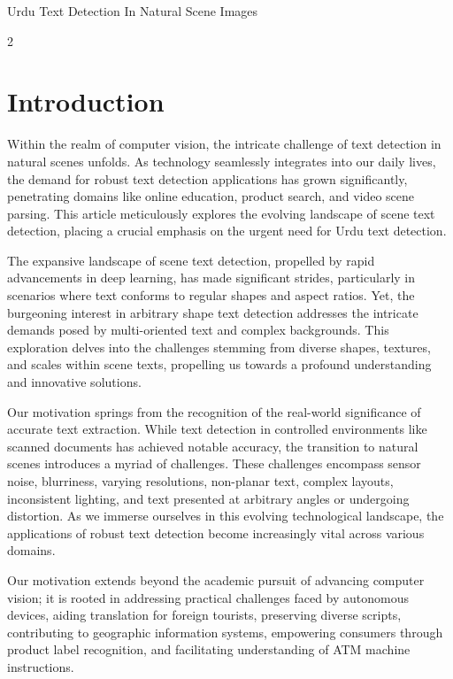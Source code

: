 \documentclass[sn-mathphys,Numbered]{sn-jnl}%
\begin{document}


\maketitle Urdu Text Detection In Natural Scene Images
\begin{multicols}{2}

\section{Introduction}\label{sec1}
Within the realm of computer vision, the intricate challenge of text detection in natural scenes unfolds. As technology seamlessly integrates into our daily lives, the demand for robust text detection applications has grown significantly, penetrating domains like online education, product search, and video scene parsing. This article meticulously explores the evolving landscape of scene text detection, placing a crucial emphasis on the urgent need for Urdu text detection.

The expansive landscape of scene text detection, propelled by rapid advancements in deep learning, has made significant strides, particularly in scenarios where text conforms to regular shapes and aspect ratios. Yet, the burgeoning interest in arbitrary shape text detection addresses the intricate demands posed by multi-oriented text and complex backgrounds. This exploration delves into the challenges stemming from diverse shapes, textures, and scales within scene texts, propelling us towards a profound understanding and innovative solutions.

Our motivation springs from the recognition of the real-world significance of accurate text extraction. While text detection in controlled environments like scanned documents has achieved notable accuracy, the transition to natural scenes introduces a myriad of challenges. These challenges encompass sensor noise, blurriness, varying resolutions, non-planar text, complex layouts, inconsistent lighting, and text presented at arbitrary angles or undergoing distortion. As we immerse ourselves in this evolving technological landscape, the applications of robust text detection become increasingly vital across various domains.

Our motivation extends beyond the academic pursuit of advancing computer vision; it is rooted in addressing practical challenges faced by autonomous devices, aiding translation for foreign tourists, preserving diverse scripts, contributing to geographic information systems, empowering consumers through product label recognition, and facilitating understanding of ATM machine instructions.


\end{multicols}
\end{document}
